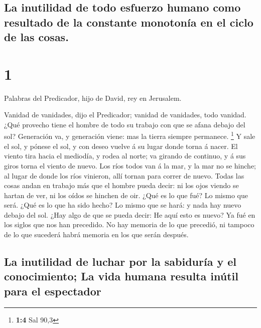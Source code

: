 \hypertarget{la-inutilidad-de-todo-esfuerzo-humano-como-resultado-de-la-constante-monotonuxeda-en-el-ciclo-de-las-cosas.}{%
\subsection{La inutilidad de todo esfuerzo humano como resultado de la
constante monotonía en el ciclo de las
cosas.}\label{la-inutilidad-de-todo-esfuerzo-humano-como-resultado-de-la-constante-monotonuxeda-en-el-ciclo-de-las-cosas.}}

\hypertarget{section}{%
\section{1}\label{section}}

 Palabras del Predicador, hijo de David, rey en Jerusalem.

 Vanidad de vanidades, dijo el Predicador; vanidad de
vanidades, todo vanidad.  ¿Qué provecho tiene el hombre de
todo su trabajo con que se afana debajo del sol?  Generación
va, y generación viene: mas la tierra siempre permanece. \footnote{\textbf{1:4}
  Sal 90,3}  Y sale el sol, y pónese el sol, y con deseo
vuelve á su lugar donde torna á nacer.  El viento tira hacia
el mediodía, y rodea al norte; va girando de continuo, y á sus giros
torna el viento de nuevo.  Los ríos todos van á la mar, y la
mar no se hinche; al lugar de donde los ríos vinieron, allí tornan para
correr de nuevo.  Todas las cosas andan en trabajo más que
el hombre pueda decir: ni los ojos viendo se hartan de ver, ni los oídos
se hinchen de oir.  ¿Qué es lo que fué? Lo mismo que será.
¿Qué es lo que ha sido hecho? Lo mismo que se hará: y nada hay nuevo
debajo del sol.  ¿Hay algo de que se pueda decir: He aquí
esto es nuevo? Ya fué en los siglos que nos han precedido. 
No hay memoria de lo que precedió, ni tampoco de lo que sucederá habrá
memoria en los que serán después.

\hypertarget{la-inutilidad-de-luchar-por-la-sabiduruxeda-y-el-conocimiento-la-vida-humana-resulta-inuxfatil-para-el-espectador}{%
\subsection{La inutilidad de luchar por la sabiduría y el conocimiento;
La vida humana resulta inútil para el
espectador}\label{la-inutilidad-de-luchar-por-la-sabiduruxeda-y-el-conocimiento-la-vida-humana-resulta-inuxfatil-para-el-espectador}}


